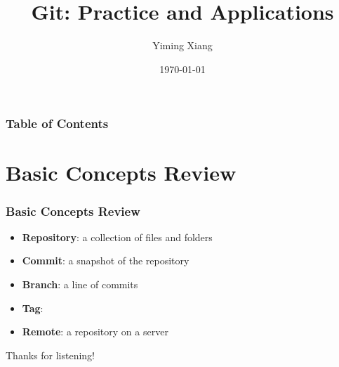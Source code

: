 \documentclass[aspectratio=169]{beamer}
\title{Git: Practice and Applications}
\author{Yiming Xiang}
\institute{UM-SJTU Joint Institute}
\date{\today}
\begin{document}
\frame{\titlepage}

\begin{frame}
    \frametitle{Table of Contents}
    \tableofcontents
\end{frame}

\section{Basic Concepts Review}

\begin{frame}
    \frametitle{Basic Concepts Review}
    \begin{itemize}
        \item \textbf{Repository}: a collection of files and folders
        \item \textbf{Commit}: a snapshot of the repository
        \item \textbf{Branch}: a line of commits
        \item \textbf{Tag}:
        \item \textbf{Remote}: a repository on a server
    \end{itemize}
\end{frame}

\begin{frame}
    \Huge{\textcolor{UMBlue}{Thanks for listening!}}
\end{frame}
\end{document}
